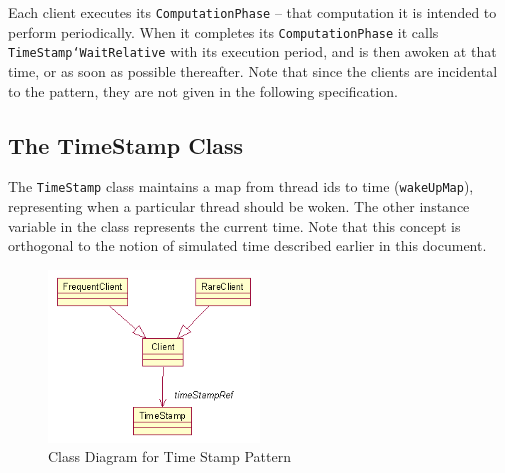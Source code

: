 \documentclass{overturerepchap}
\begin{document}
Each client executes its
\texttt{ComputationPhase} -- that computation it is intended to perform
periodically. When it completes its \texttt{ComputationPhase} it calls 
\texttt{TimeStamp`WaitRelative} with its
execution period, and is then awoken at that time, or as soon as
possible thereafter. Note that since the clients are incidental to the 
pattern, they are not given in the following specification.


\subsection{The TimeStamp Class}

The \texttt{TimeStamp} class maintains a map from thread ids to 
time (\texttt{wakeUpMap}), representing when a particular thread 
should be woken. The other instance variable in the class
represents the current time. Note that this concept is orthogonal to
the notion of simulated time described earlier in this document.

\begin{figure}
\begin{center}
\includegraphics[width=0.5\textwidth]{figures/timestamp.png}
\end{center}
\caption{Class Diagram for Time Stamp Pattern\label{fig:classtimestamp}}
\end{figure}

\end{document}
